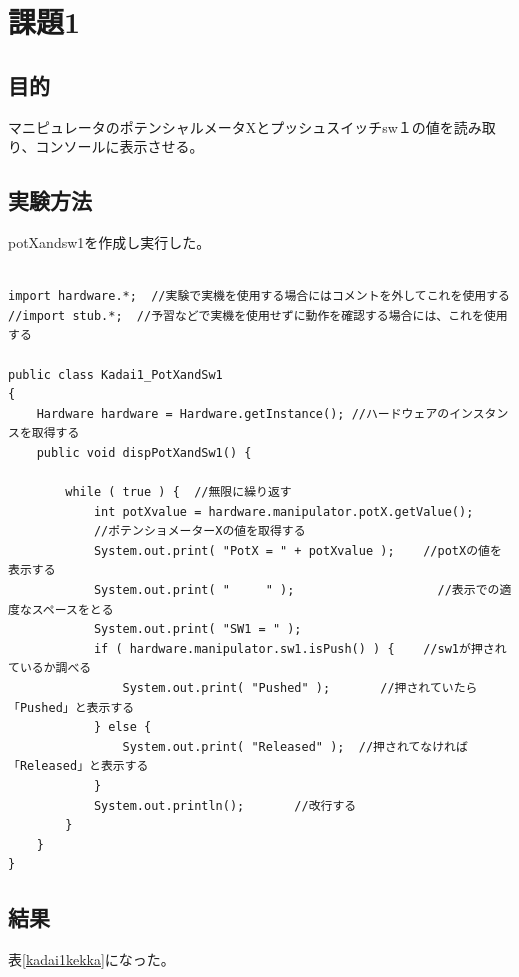 \documentclass{jarticle}
\begin{document}
\section{課題1}
\subsection{目的}
マニピュレータのポテンシャルメータXとプッシュスイッチsw１の値を読み取り、コンソールに表示させる。


\subsection{実験方法}

potXandsw1を作成し実行した。

\begin{lstlisting}[caption=PotXandsw1]

import hardware.*;  //実験で実機を使用する場合にはコメントを外してこれを使用する
//import stub.*;  //予習などで実機を使用せずに動作を確認する場合には、これを使用する

public class Kadai1_PotXandSw1
{
    Hardware hardware = Hardware.getInstance(); //ハードウェアのインスタンスを取得する
    public void dispPotXandSw1() {

        while ( true ) {  //無限に繰り返す
            int potXvalue = hardware.manipulator.potX.getValue();
            //ポテンショメーターXの値を取得する
            System.out.print( "PotX = " + potXvalue );    //potXの値を表示する
            System.out.print( "     " );                    //表示での適度なスペースをとる
            System.out.print( "SW1 = " );
            if ( hardware.manipulator.sw1.isPush() ) {    //sw1が押されているか調べる
                System.out.print( "Pushed" );       //押されていたら「Pushed」と表示する
            } else {
                System.out.print( "Released" );  //押されてなければ「Released」と表示する
            }
            System.out.println();       //改行する
        }
    }
}

\end{lstlisting}

\subsection{結果}
表\ref{kadai1kekka}になった。
\end{document}
